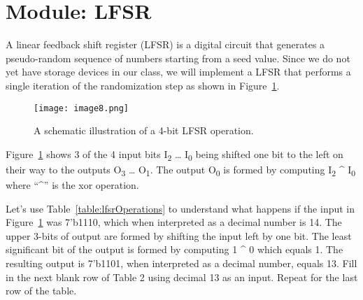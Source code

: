 \section{Module: LFSR}

A linear feedback shift register (LFSR) is a digital circuit that
generates a pseudo-random sequence of numbers starting from a seed
value. Since we do not yet have storage devices in our class, we will
implement a LFSR that performs a single iteration of the randomization
step as shown in Figure~\ref{fig:lfsrOperation}.

\begin{figure}[ht]
\texttt{[image: image8.png]}
\caption{A schematic illustration of a 4-bit LFSR operation.}
\label{fig:lfsrOperation}
\end{figure}

Figure~\ref{fig:lfsrOperation} shows 3 of the 4 input bits I\textsubscript{2} \ldots{}
I\textsubscript{0} being shifted one bit to the left on their way to the
outputs O\textsubscript{3} \ldots{} O\textsubscript{1}. The output
O\textsubscript{0} is formed by computing I\textsubscript{2} \^{}
I\textsubscript{0} where ``\^{}'' is the xor operation.

Let's use Table~\ref{table:lfsrOperations} to 
understand what happens if the input in 
Figure~\ref{fig:lfsrOperation}
was 7'b1110, which when interpreted as a decimal number is 14. The upper
3-bits of output are formed by shifting the input left by one bit. The
least significant bit of the output is formed by computing 1 \^{} 0
which equals 1. The resulting output is 7'b1101, when interpreted as a
decimal number, equals 13. Fill in the next blank row of Table 2 using
decimal 13 as an input. Repeat for the last row of the table.

